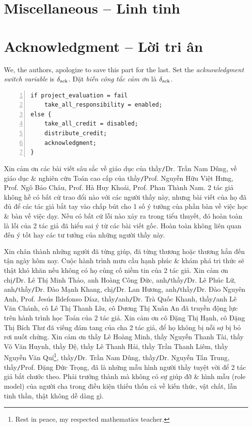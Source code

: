 \documentclass[12pt]{article}
\begin{document}
\section{Miscellaneous -- Linh tinh}


\appendix


\section{Acknowledgment -- Lời tri ân}
We, the authors, apologize to save this part for the last. Set the {\it acknowledgment switch variable} is $\delta_{\rm ack}$. Đặt {\it biến công tắc cảm ơn} là $\delta_{\rm ack}$.

\begin{Verbatim}[numbers=left,xleftmargin=5mm]
if project_evaluation = fail
    take_all_responsibility = enabled;
else {
    take_all_credit = disabled;
    distribute_credit;
    acknowledgment;
}
\end{Verbatim}
Xin cảm ơn các bài viết sâu sắc về giáo dục của thầy{\tt/}Dr. {\sc Trần Nam Dũng}, về giáo dục \& nghiên cứu Toán cao cấp của thầy{\tt/}Prof. {\sc Nguyễn Hữu Việt Hưng}, Prof. {\sc Ngô Bảo Châu}, Prof. {\sc Hà Huy Khoái}, Prof. {\sc Phan Thành Nam}. 2 tác giả không hề có bất cứ trao đổi nào với các người thầy này, nhưng bài viết của họ đã đủ để các tác giả bắt tay vào chấp bút cho 1 số ý tưởng của phần bàn về việc học \& bàn về việc dạy. Nếu có bất cứ lỗi nào xảy ra trong tiểu thuyết, đó hoàn toàn là lỗi của 2 tác giả đã hiểu sai ý từ các bài viết gốc. Hoàn toàn không liên quan đến ý tốt hay các tư tưởng của những người thầy này.

Xin chân thành những người đã từng giúp, đã từng thương hoặc thương hắn đến tận ngày hôm nay. Cuộc hành trình mưu cầu hạnh phúc \& khám phá tri thức sẽ thật khó khăn nếu không có họ củng cố niềm tin của 2 tác giả. Xin cảm ơn chị{\tt/}Dr. {\sc Lê Thị Minh Thảo}, anh {\sc Hoàng Công Đức}, anh{\tt/}thầy{\tt/}Dr. {\sc Lê Phúc Lữ}, anh{\tt/}thầy{\tt/}Dr.  {\sc Đào Mạnh Khang}, chị{\tt/}Dr.  {\sc Lan Hương}, anh{\tt/}thầy{\tt/}Dr.  {\sc Đào Nguyên Anh}, Prof. {\sc Jesús Ildefonso Díaz}, thầy{\tt/}anh{\tt/}Dr.  {\sc Trà Quốc Khanh}, thầy{\tt/}anh {\sc Lê Văn Chánh}, cô {\sc Lê Thị Thanh Lĩu}, cô {\sc Dương Thị Xuân An} đã truyền động lực trên hành trình học Toán của 2 tác giả. Xin cảm ơn cô {\sc Đặng Thị Hạnh}, cô {\sc Đặng Thị Bích Thư} đã viếng đám tang của cha 2 tác giả, để họ không bị nỗi sợ bị bỏ rơi nuốt chửng. Xin cảm ơn thầy {\sc Lê Hoàng Minh}, thầy {\sc Nguyễn Thanh Tài}, thầy {\sc Võ Văn Huynh}, thầy {\sc Đệ}, thầy {\sc Lê Thanh Hải}, thầy {\sc Trần Thanh Liêm}, thầy {\sc Nguyễn Văn Quí}\footnote{Rest in peace, my respected mathematics teacher.}, thầy{\tt/}Dr.  {\sc Trần Nam Dũng}, thầy{\tt/}Dr. {\sc Nguyễn Tấn Trung}, thầy{\tt/}Prof.  {\sc Đặng Đức Trọng}, đã là những mẫu hình người thầy tuyệt vời để 2 tác giả bắt chước theo. Phải trưởng thành mà không có sự giúp đỡ \& hình mẫu (role model) của người cha trong điều kiện thiếu thốn cả về kiến thức, vật chất, lẫn tinh thần, thật không dễ dàng gì.
\end{document}
